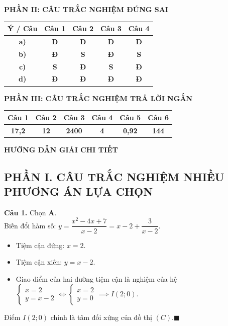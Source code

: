 \documentclass[12pt,a4paper]{article}
\begin{document}
\vspace{0.5cm}
\noindent\textbf{\large PHẦN II: CÂU TRẮC NGHIỆM ĐÚNG SAI}
\begin{center}
\renewcommand{\arraystretch}{1.3}
\begin{tabular}{|c|c|c|c|c|}
\hline
\textbf{Ý / Câu} & \textbf{Câu 1} & \textbf{Câu 2} & \textbf{Câu 3} & \textbf{Câu 4} \\ \hline
\textbf{a)} & \textbf{Đ} & \textbf{Đ} & \textbf{Đ} & \textbf{Đ} \\ \hline
\textbf{b)} & \textbf{Đ} & \textbf{S} & \textbf{Đ} & \textbf{S} \\ \hline
\textbf{c)} & \textbf{S} & \textbf{Đ} & \textbf{S} & \textbf{Đ} \\ \hline
\textbf{d)} & \textbf{Đ} & \textbf{Đ} & \textbf{Đ} & \textbf{Đ} \\ \hline
\end{tabular}
\end{center}

\vspace{0.5cm}
\noindent\textbf{\large PHẦN III: CÂU TRẮC NGHIỆM TRẢ LỜI NGẮN}
\begin{center}
\renewcommand{\arraystretch}{1.4}
\begin{tabular}{|c|c|c|c|c|c|}
\hline
\textbf{Câu 1} & \textbf{Câu 2} & \textbf{Câu 3} & \textbf{Câu 4} & \textbf{Câu 5} & \textbf{Câu 6} \\ \hline
\textbf{17,2} & \textbf{12} & \textbf{2400} & \textbf{4} & \textbf{0,92} & \textbf{144} \\ \hline
\end{tabular}
\end{center}

\newpage
\begin{center}
    \textbf{\Large HƯỚNG DẪN GIẢI CHI TIẾT}
\end{center}
\vspace{0.3cm}

\subsection*{\large PHẦN I. CÂU TRẮC NGHIỆM NHIỀU PHƯƠNG ÁN LỰA CHỌN}

\noindent\textbf{Câu 1.} Chọn \textbf{A}.\\
Biến đổi hàm số: $y = \dfrac{x^2 - 4x + 7}{x - 2} = x - 2 + \dfrac{3}{x - 2}$.
\begin{itemize}[leftmargin=*]
    \item Tiệm cận đứng: $x = 2$.
    \item Tiệm cận xiên: $y = x - 2$.
    \item Giao điểm của hai đường tiệm cận là nghiệm của hệ $\begin{cases} x = 2 \\ y = x - 2 \end{cases} \iff \begin{cases} x = 2 \\ y = 0 \end{cases} \implies I(2; 0)$.
\end{itemize}
Điểm $I(2; 0)$ chính là tâm đối xứng của đồ thị $(C)$.\hfill$\blacksquare$
\end{document}
